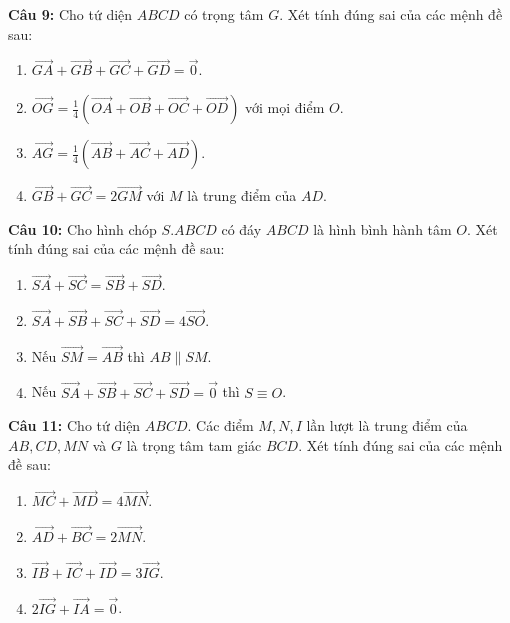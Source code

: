 \documentclass[12pt]{article}
\begin{document}
	\vspace{0.2cm}
	\noindent \textbf{Câu 9:} Cho tứ diện $ABCD$ có trọng tâm $G$. Xét tính đúng sai của các mệnh đề sau:
	\begin{enumerate}[label=\alph*)]
		\item $\overrightarrow{GA} + \overrightarrow{GB} + \overrightarrow{GC} + \overrightarrow{GD} = \vec{0}$.
		\item $\overrightarrow{OG} = \frac{1}{4}(\overrightarrow{OA} + \overrightarrow{OB} + \overrightarrow{OC} + \overrightarrow{OD})$ với mọi điểm $O$.
		\item $\overrightarrow{AG} = \frac{1}{4}(\overrightarrow{AB} + \overrightarrow{AC} + \overrightarrow{AD})$.
		\item $\overrightarrow{GB} + \overrightarrow{GC} = 2\overrightarrow{GM}$ với $M$ là trung điểm của $AD$.
	\end{enumerate}
	
	\vspace{0.2cm}
	\noindent \textbf{Câu 10:} Cho hình chóp $S.ABCD$ có đáy $ABCD$ là hình bình hành tâm $O$. Xét tính đúng sai của các mệnh đề sau:
	\begin{enumerate}[label=\alph*)]
		\item $\overrightarrow{SA} + \overrightarrow{SC} = \overrightarrow{SB} + \overrightarrow{SD}$.
		\item $\overrightarrow{SA} + \overrightarrow{SB} + \overrightarrow{SC} + \overrightarrow{SD} = 4\overrightarrow{SO}$.
		\item Nếu $\overrightarrow{SM} = \overrightarrow{AB}$ thì $AB \parallel SM$.
		\item Nếu $\overrightarrow{SA} + \overrightarrow{SB} + \overrightarrow{SC} + \overrightarrow{SD} = \vec{0}$ thì $S \equiv O$.
	\end{enumerate}
	
	\noindent \textbf{Câu 11:} Cho tứ diện $ABCD$. Các điểm $M, N, I$ lần lượt là trung điểm của $AB, CD, MN$ và $G$ là trọng tâm tam giác $BCD$. Xét tính đúng sai của các mệnh đề sau:
	\begin{enumerate}[label=\alph*)]
		\item $\overrightarrow{MC} + \overrightarrow{MD} = 4\overrightarrow{MN}$.
		\item $\overrightarrow{AD} + \overrightarrow{BC} = 2\overrightarrow{MN}$.
		\item $\overrightarrow{IB} + \overrightarrow{IC} + \overrightarrow{ID} = 3\overrightarrow{IG}$.
		\item $2\overrightarrow{IG} + \overrightarrow{IA} = \vec{0}$.
	\end{enumerate}
	
\end{document}
